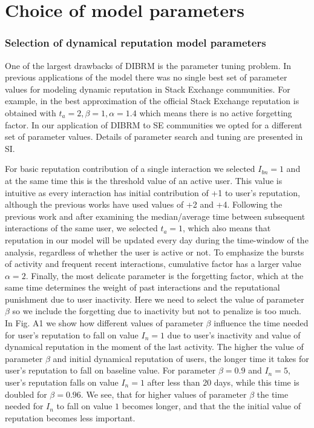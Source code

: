 \chapter{Choice of model parameters}

\subsection{Selection of dynamical reputation model parameters} \label{section:param}
One of the largest drawbacks of DIBRM is the parameter tuning problem. In previous applications of the model \cite{melnikovDynamicInteractionBasedReputation2018,yashkina2020} there was no single best set of parameter values for modeling dynamic reputation in Stack Exchange communities. For example, in \cite{yashkina2020} the best approximation of the official Stack Exchange reputation is obtained with $t_a =2, \beta = 1, \alpha = 1.4$ which means there is no active forgetting factor. In our application of DIBRM to SE communities we opted for a different set of parameter values. Details of parameter search and tuning are presented in SI.

For basic reputation contribution of a single interaction we selected $I_{bn} = 1$ and at the same time this is the threshold value of an active user. This value is intuitive as every interaction has initial contribution of +1 to user's reputation, although the previous works have used values of +2 and +4. Following the previous work and after examining the median/average time between subsequent interactions of the same user, we selected $t_a = 1$, which also means that reputation in our model will be updated every day during the time-window of the analysis, regardless of whether the user is active or not. To emphasize the bursts of activity and frequent recent interactions, cumulative factor has a larger value $\alpha = 2$. Finally, the most delicate parameter is the forgetting factor, which at the same time determines the weight of past interactions and the reputational punishment due to user inactivity. Here we need to select the value of parameter $\beta$ so we include the forgetting due to inactivity but not to penalize is too much. In Fig. A1 we show how different values of parameter $\beta$ influence the time needed for user's reputation to fall on value $I_{n}=1$ due to user's inactivity and value of dynamical reputation in the moment of the last activity. The higher the value of parameter $\beta$ and initial dynamical reputation of users, the longer time it takes for user's reputation to fall on baseline value. For parameter $\beta=0.9$ and $I_{n}=5$, user's reputation falls on value $I_{n}=1$ after less than 20 days, while this time is doubled for $\beta=0.96$. We see, that for higher values of parameter $\beta$ the time needed for $I_{n}$ to fall on value $1$ becomes longer, and that the the initial value of reputation becomes less important. 

